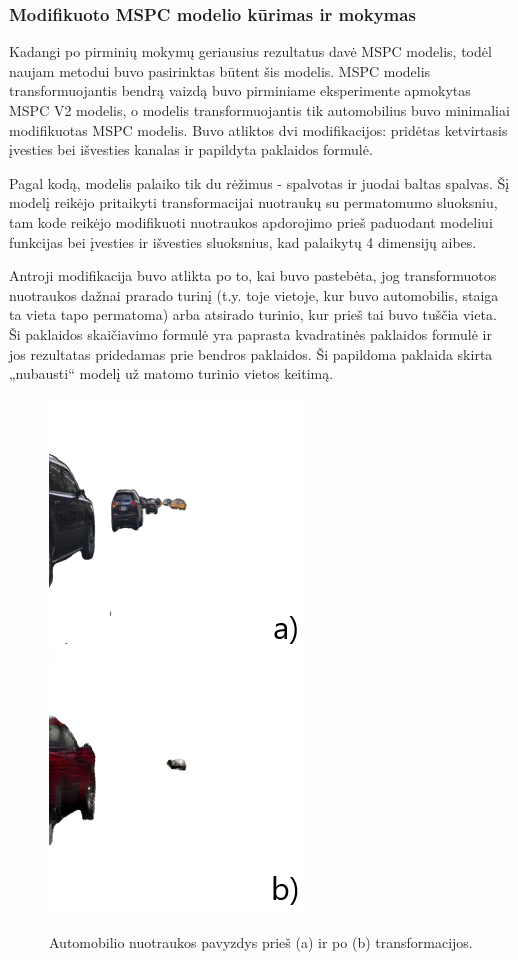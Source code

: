 \documentclass{VUMIFPSbakalaurinis}
\begin{document}
    
        \subsubsection{Modifikuoto MSPC modelio kūrimas ir mokymas}
            Kadangi po pirminių mokymų geriausius rezultatus davė MSPC modelis, todėl naujam metodui buvo pasirinktas būtent šis modelis. MSPC modelis transformuojantis bendrą vaizdą buvo pirminiame eksperimente apmokytas MSPC V2 modelis, o modelis transformuojantis tik automobilius buvo minimaliai modifikuotas MSPC modelis. Buvo atliktos dvi modifikacijos: pridėtas ketvirtasis įvesties bei išvesties kanalas ir papildyta paklaidos formulė. 
            
            Pagal kodą, modelis palaiko tik du rėžimus - spalvotas ir juodai baltas spalvas. Šį modelį reikėjo pritaikyti transformacijai nuotraukų su permatomumo sluoksniu, tam kode reikėjo modifikuoti nuotraukos apdorojimo prieš paduodant modeliui funkcijas bei įvesties ir išvesties sluoksnius, kad palaikytų 4 dimensijų aibes. 
            
            Antroji modifikacija buvo atlikta po to, kai buvo pastebėta, jog transformuotos nuotraukos dažnai prarado turinį (t.y. toje vietoje, kur buvo automobilis, staiga ta vieta tapo permatoma) arba atsirado turinio, kur prieš tai buvo tuščia vieta. Ši paklaidos skaičiavimo formulė yra paprasta kvadratinės paklaidos formulė ir jos rezultatas pridedamas prie bendros paklaidos. Ši papildoma paklaida skirta „nubausti“ modelį už matomo turinio vietos keitimą.

            \begin{figure}[H]
                \centering
                \includegraphics[scale=0.8]{img/CarTrans/before}
                \includegraphics[scale=0.8]{img/CarTrans/after}
                \caption{Automobilio nuotraukos pavyzdys prieš (a) ir po (b) transformacijos.}
                \label{img:mlp}
            \end{figure}
\end{document}
